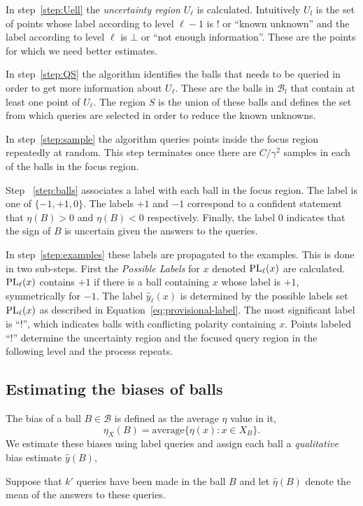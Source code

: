 \documentclass[twoside]{article}
\def\B{{\mathcal B}}
\def\yh{{\widehat{y}}}
\def\PL{{\mbox{\rm PL}}}
\begin{document}
In step~\ref{step:Uell} the {\em uncertainty region} $U_\ell$ is
calculated. Intuitively $U_l$ is the set of points whose label
according to level $\ell-1$ is ! or ``known unknown'' and the label
according to level $\ell$ is $\bot$ or ``not enough information''.
These are the points for which we need better estimates.

In step~\ref{step:QS} the algorithm identifies the balls that needs to
be queried in order to get more information about $U_\ell$. These are
the balls in $\B_l$ that contain at least one point of $U_\ell$.  The
region $S$ is the union of these balls and defines the set
from which queries are selected in order to reduce the known unknowns.

In step~\ref{step:sample} the algorithm queries points inside the
focus region repeatedly at random.  This step terminates once there are
$C/\gamma^2$ samples in each of the balls in the focus region.

Step ~\ref{step:balls} associates a label with each ball in the focus region. The
label is one of $\{-1,+1,0\}$.  The labels $+1$ and $-1$ correspond to
a confident statement that $\eta(B)>0$ and $\eta(B)<0$
respectively. Finally, the label $0$ indicates that the sign of $B$
is uncertain given the answers to the queries.

In step~\ref{step:examples} these labels are propagated to the
examples.  This is done in two sub-steps. First the {\em Possible
  Labels} for $x$ denoted $\PL_\ell(x)$ are calculated. $\PL_\ell(x)$
contains $+1$ if there is a ball containing $x$ whose label is $+1$,
symmetrically for $-1$. The label $\yh_\ell(x)$ is determined by the
possible labels set $\PL_\ell(x)$ as described in
Equation~\ref{eq:provisional-label}. The most significant label is ``!'', which
indicates balls with conflicting polarity containing $x$. Points
labeled ``!'' determine the uncertainty region and the focused query
region in the following level and the process repeats.

\iffalse
  \subsection{Estimating the biases of balls}

The bias of a ball $B \in \B$ is defined as the average $\eta$ value in it,
$$ \eta_X(B) = \mbox{average}\{\eta(x): x \in X_B \} .$$
We estimate these biases using label queries and assign each ball a
\emph{qualitative} bias estimate $\yh(B)$,

Suppose that $k'$ queries have been made in the ball $B$ and let
$\widehat{\eta}(B)$ denote the mean of the answers to these queries.
\end{document}
